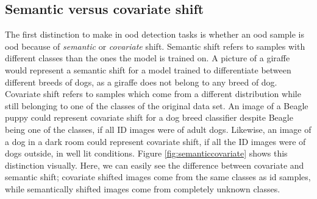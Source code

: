 \documentclass[UKenglish]{uiomasterthesis} %
\theoremstyle{definition}
\begin{document}
\subsection{Semantic versus covariate shift}

The first distinction to make in \ac{ood} detection tasks is whether an \ac{ood} sample is \ac{ood} because of {\it semantic} or {\it covariate} shift. Semantic shift refers to samples with different classes than the ones the model is trained on. A picture of a giraffe would represent a semantic shift for a model trained to differentiate between different breeds of dogs, as a giraffe does not belong to any breed of dog. Covariate shift refers to samples which come from a different distribution while still belonging to one of the classes of the original data set. An image of a Beagle puppy could represent covariate shift for a dog breed classifier despite Beagle being one of the classes, if all ID images were of adult dogs. Likewise, an image of a dog in a dark room could represent covariate shift, if all the ID images were of dogs outside, in well lit conditions. Figure \ref{fig:semanticcovariate} shows this distinction visually. Here, we can easily see the difference between covariate and semantic shift; covariate shifted images come from the same classes as \ac{id} samples, while semantically shifted images come from completely unknown classes.
\end{document}
